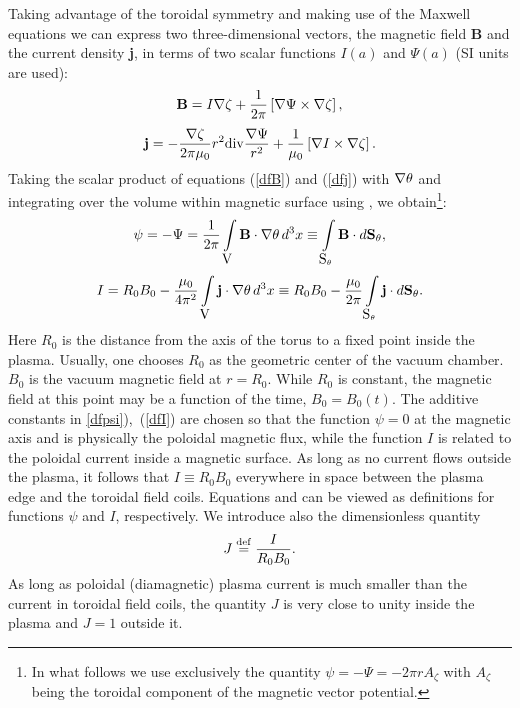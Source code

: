 Taking advantage of the toroidal symmetry and making use of the Maxwell
equations we can express two three-dimensional vectors, the magnetic
field {\bf B} and the current density {\bf j}, in terms of two scalar
functions $I(a)$ and $\Psi(a)$ (SI units are used): 
\begin{equation}\label{dfB}
\displaystyle
{\bf B}
=I\nabla\zeta+\frac{1}{2\pi}\left[\nabla\Psi\times\nabla\zeta\right]
,\end{equation}
\begin{equation}\label{dfj}
\displaystyle
{\bf j}
=-\frac{\nabla\zeta}{2\pi\mu_0}r^2{\rm div}\frac{\nabla\Psi}{r^2}
+\frac{1}{\mu_0}\left[\nabla I\times\nabla\zeta\right]
.\end{equation}
Taking the scalar product of equations (\ref{dfB}) and (\ref{dfj}) with
$\nabla\theta$ and integrating over the volume within magnetic surface
using , we obtain\footnote{In what follows we use exclusively
the quantity $\psi=-\Psi=-2\pi rA_\zeta$ with $A_\zeta$ being the
toroidal component of the magnetic vector potential.}: 
\begin{equation}
\label{dfpsi}
\psi
=-\Psi
=\frac{1}{2\pi}\int\limits_{\mbox{\cal V}}{\bf B}\cdot\nabla\theta\, d^3x
\equiv
\int\limits_{{\mbox{\cal S}}_\theta}{\bf B}\cdot d{\bf S}_\theta
,\end{equation}
\begin{equation}
\label{dfI}
I
=R_0 B_0-\frac{\mu_0}{4\pi^2}\int\limits_{\mbox{\cal V}}{\bf
j}\cdot\nabla\theta\, d^3x 
\equiv
R_0 B_0-\frac{\mu_0}{2\pi}
\int\limits_{{\mbox{\cal S}}_\theta}{\bf j}\cdot d{\bf S}_\theta
.\end{equation}
Here $R_0$ is the distance from the axis of the torus to a fixed point 
inside the plasma.
Usually, one chooses $R_0$ as the geometric center of the vacuum chamber.
$B_0$ is the vacuum magnetic field at $r=R_0$. 
While $R_0$ is constant, the magnetic field at this point may be a
function of the time, $B_0=B_0(t)$. 
The additive constants in \eqs\ref{dfpsi}),~(\ref{dfI}) are chosen so
that the function $\psi=0$ at the magnetic axis and is physically
the poloidal magnetic flux, while the function $I$ is related to the
poloidal current inside a magnetic surface. 
As long as no current flows outside the plasma, it follows that $I\equiv
R_0B_0$ everywhere in space between the plasma edge and the toroidal
field coils.  
Equations  and  can be viewed as definitions for
functions $\psi$ and $I$, respectively. We introduce also the
dimensionless quantity 
\begin{equation}
\label{dfJ}
J\stackrel{{\rm def}}{=}\frac{I}{R_0 B_0}
.\end{equation}
As long as poloidal (diamagnetic) plasma current is much smaller than
the current in toroidal field coils, the quantity $J$ is very close to
unity inside the plasma and $J=1$ outside it. 

